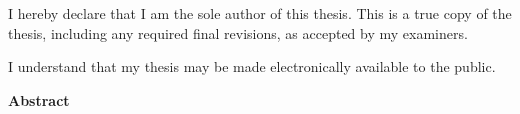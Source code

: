 \cleardoublepage %
 


  \noindent
I hereby declare that I am the sole author of this thesis. This is a true copy of the thesis, including any required final revisions, as accepted by my examiners.

  \bigskip
  
  \noindent
I understand that my thesis may be made electronically available to the public.

\cleardoublepage


\begin{center}\textbf{Abstract}\end{center}

